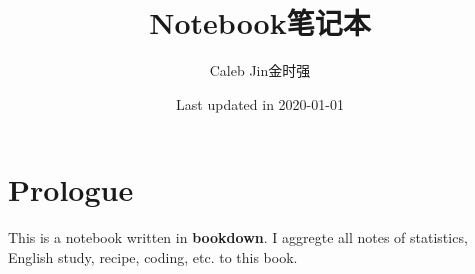 \documentclass[
]{book}
\title{Notebook\textbar{}笔记本}
\author{Caleb Jin\textbar{}金时强}
\date{Last updated in 2020-01-01}
\begin{document}
\maketitle

{
\setcounter{tocdepth}{1}
\tableofcontents
}
\hypertarget{prologue}{%
\chapter{Prologue}\label{prologue}}

This is a notebook written in \textbf{bookdown}. I aggregte all notes of statistics, English study, recipe, coding, etc. to this book.

\newcommand{\ua}{{\bf a}} 
\newcommand{\uA}{{\bf A}}
\newcommand{\ub}{{\bf b}} 
\newcommand{\uB}{{\bf B}}
\newcommand{\uc}{{\bf c}}
\newcommand{\uC}{{\bf C}}
\newcommand{\ud}{{\bf d}} 
\newcommand{\uD}{{\bf D}}
\newcommand{\ue}{{\bf e}}
\newcommand{\uE}{{\bf E}}
\newcommand{\uf}{{\bf f}}
\newcommand{\uF}{{\bf F}}
\newcommand{\ug}{{\bf g}}
\newcommand{\uG}{{\bf G}}
\newcommand{\uh}{{\bf h}}
\newcommand{\uH}{{\bf H}} 
\newcommand{\ui}{{\bf i}}
\newcommand{\uI}{{\bf I}} 
\newcommand{\uj}{{\bf j}}
\newcommand{\uJ}{{\bf J}}
\newcommand{\uk}{{\bf k}}
\newcommand{\uK}{{\bf K}}
\newcommand{\ul}{{\bf l}}
\newcommand{\uL}{{\bf L}}
\newcommand{\um}{{\bf m}} 
\newcommand{\uM}{{\bf M}}
\newcommand{\un}{{\bf n}}
\newcommand{\uN}{{\bf N}}
\newcommand{\uo}{{\bf o}}
\newcommand{\uO}{{\bf O}}
\newcommand{\up}{{\bf p}}
\newcommand{\uP}{{\bf P}}
\newcommand{\uq}{{\bf q}}
\newcommand{\uQ}{{\bf Q}}
\newcommand{\ur}{{\bf r}}
\newcommand{\uR}{{\bf R}}
\newcommand{\us}{{\bf s}}
\newcommand{\uS}{{\bf S}}
\newcommand{\ut}{{\bf t}}
\newcommand{\uT}{{\bf T}}
\newcommand{\uu}{{\bf u}}
\newcommand{\uU}{{\bf U}}
\newcommand{\uv}{{\bf v}}
\newcommand{\uV}{{\bf V}}
\newcommand{\uw}{{\bf w}}
\newcommand{\uW}{{\bf W}}
\newcommand{\ux}{{\bf x}}
\newcommand{\uX}{{\bf X}} 
\newcommand{\uy}{{\bf y}} 
\newcommand{\uY}{{\bf Y}}
\newcommand{\uz}{{\bf z}}
\newcommand{\uZ}{{\bf Z}}
\end{document}
